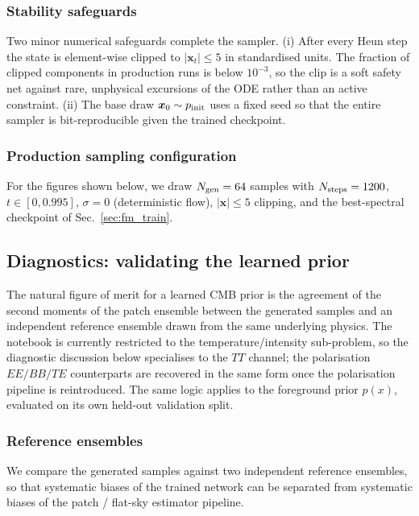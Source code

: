 \documentclass[11pt]{article}
\DeclareRobustCommand{\xvec}{\bm{x}}
\newcommand{\pinit}{p_{\rm init}}
\theoremstyle{definition}
\begin{document}
\subsubsection{Stability safeguards}

Two minor numerical safeguards complete the sampler. (i) After every Heun step the state is element-wise clipped to $|\xvec_t|\leq 5$ in standardised units. The fraction of clipped components in production runs is below $10^{-3}$, so the clip is a soft safety net against rare, unphysical excursions of the ODE rather than an active constraint. (ii) The base draw $\xvec_0\sim\pinit$ uses a fixed seed so that the entire sampler is bit-reproducible given the trained checkpoint.

\subsubsection{Production sampling configuration}

For the figures shown below, we draw $N_{\rm gen}=64$ samples with $N_{\rm steps}=1200$, $t\in[0,0.995]$, $\sigma=0$ (deterministic flow), $|\xvec|\leq 5$ clipping, and the best-spectral checkpoint of Sec.~\ref{sec:fm_train}.

\subsection{Diagnostics: validating the learned prior}
\label{sec:fm_diagnostics}

The natural figure of merit for a learned CMB prior is the agreement of the second moments of the patch ensemble between the generated samples and an independent reference ensemble drawn from the same underlying physics. The notebook is currently restricted to the temperature/intensity sub-problem, so the diagnostic discussion below specialises to the $TT$ channel; the polarisation $EE/BB/TE$ counterparts are recovered in the same form once the polarisation pipeline is reintroduced. The same logic applies to the foreground prior $p(x)$, evaluated on its own held-out validation split.

\subsubsection{Reference ensembles}

We compare the generated samples against two independent reference ensembles, so that systematic biases of the trained network can be separated from systematic biases of the patch / flat-sky estimator pipeline.
\end{document}
